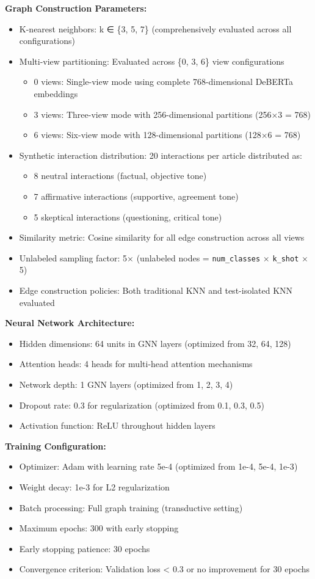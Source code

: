 \textbf{Graph Construction Parameters:}
\begin{itemize}
\item K-nearest neighbors: k ∈ \{3, 5, 7\} (comprehensively evaluated across all configurations)
\item Multi-view partitioning: Evaluated across \{0, 3, 6\} view configurations
  \begin{itemize}
  \item 0 views: Single-view mode using complete 768-dimensional DeBERTa embeddings
  \item 3 views: Three-view mode with 256-dimensional partitions (256×3 = 768)
  \item 6 views: Six-view mode with 128-dimensional partitions (128×6 = 768)
  \end{itemize}
\item Synthetic interaction distribution: 20 interactions per article distributed as:
  \begin{itemize}
  \item 8 neutral interactions (factual, objective tone)
  \item 7 affirmative interactions (supportive, agreement tone)
  \item 5 skeptical interactions (questioning, critical tone)
  \end{itemize}
\item Similarity metric: Cosine similarity for all edge construction across all views
\item Unlabeled sampling factor: 5× (unlabeled nodes = \texttt{num\_classes} × \texttt{k\_shot} × 5)
\item Edge construction policies: Both traditional KNN and test-isolated KNN evaluated
\end{itemize}

\textbf{Neural Network Architecture:}
\begin{itemize}
\item Hidden dimensions: 64 units in GNN layers (optimized from {32, 64, 128})
\item Attention heads: 4 heads for multi-head attention mechanisms
\item Network depth: 1 GNN layers (optimized from {1, 2, 3, 4})
\item Dropout rate: 0.3 for regularization (optimized from {0.1, 0.3, 0.5})
\item Activation function: ReLU throughout hidden layers
\end{itemize}

\textbf{Training Configuration:}
\begin{itemize}
\item Optimizer: Adam with learning rate 5e-4 (optimized from {1e-4, 5e-4, 1e-3})
\item Weight decay: 1e-3 for L2 regularization
\item Batch processing: Full graph training (transductive setting)
\item Maximum epochs: 300 with early stopping
\item Early stopping patience: 30 epochs
\item Convergence criterion: Validation loss < 0.3 or no improvement for 30 epochs
\end{itemize}

